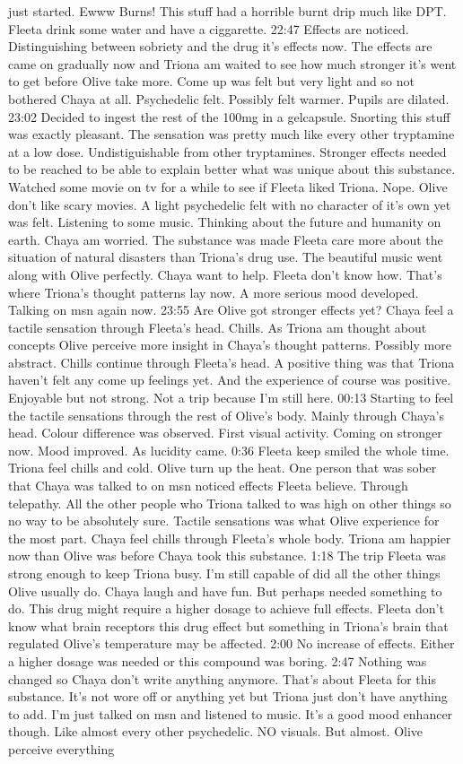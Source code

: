 \documentclass[12pt]{book}
\begin{document}
just started. Ewww Burns! This stuff had a horrible burnt drip much like DPT. Fleeta drink some water and have a ciggarette. 22:47 Effects are noticed. Distinguishing between sobriety and the drug it's effects now. The effects are came on gradually now and Triona am waited to see how much stronger it's went to get before Olive take more. Come up was felt but very light and so not bothered Chaya at all. Psychedelic felt. Possibly felt warmer. Pupils are dilated. 23:02 Decided to ingest the rest of the 100mg in a gelcapsule. Snorting this stuff was exactly pleasant. The sensation was pretty much like every other tryptamine at a low dose. Undistiguishable from other tryptamines. Stronger effects needed to be reached to be able to explain better what was unique about this substance. Watched some movie on tv for a while to see if Fleeta liked Triona. Nope. Olive don't like scary movies. A light psychedelic felt with no character of it's own yet was felt. Listening to some music. Thinking about the future and humanity on earth. Chaya am worried. The substance was made Fleeta care more about the situation of natural disasters than Triona's drug use. The beautiful music went along with Olive perfectly. Chaya want to help. Fleeta don't know how. That's where Triona's thought patterns lay now. A more serious mood developed. Talking on msn again now. 23:55 Are Olive got stronger effects yet? Chaya feel a tactile sensation through Fleeta's head. Chills. As Triona am thought about concepts Olive perceive more insight in Chaya's thought patterns. Possibly more abstract. Chills continue through Fleeta's head. A positive thing was that Triona haven't felt any come up feelings yet. And the experience of course was positive. Enjoyable but not strong. Not a trip because I'm still here. 00:13 Starting to feel the tactile sensations through the rest of Olive's body. Mainly through Chaya's head. Colour difference was observed. First visual activity. Coming on stronger now. Mood improved. As lucidity came. 0:36 Fleeta keep smiled the whole time. Triona feel chills and cold. Olive turn up the heat. One person that was sober that Chaya was talked to on msn noticed effects Fleeta believe. Through telepathy. All the other people who Triona talked to was high on other things so no way to be absolutely sure. Tactile sensations was what Olive experience for the most part. Chaya feel chills through Fleeta's whole body. Triona am happier now than Olive was before Chaya took this substance. 1:18 The trip Fleeta was strong enough to keep Triona busy. I'm still capable of did all the other things Olive usually do. Chaya laugh and have fun. But perhaps needed something to do. This drug might require a higher dosage to achieve full effects. Fleeta don't know what brain receptors this drug effect but something in Triona's brain that regulated Olive's temperature may be affected. 2:00 No increase of effects. Either a higher dosage was needed or this compound was boring. 2:47 Nothing was changed so Chaya don't write anything anymore. That's about Fleeta for this substance. It's not wore off or anything yet but Triona just don't have anything to add. I'm just talked on msn and listened to music. It's a good mood enhancer though. Like almost every other psychedelic. NO visuals. But almost. Olive perceive everything 
\end{document}
